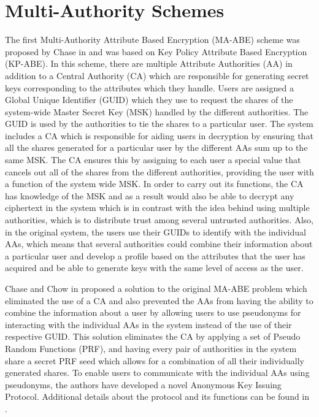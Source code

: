 \section{Multi-Authority Schemes}

The first Multi-Authority Attribute Based Encryption (MA-ABE) scheme was proposed by Chase in \cite{Chase2007}\cite{Chow2010} and was based on Key Policy Attribute Based Encryption (KP-ABE). In this scheme, there are multiple Attribute Authorities (AA) in addition to a Central Authority (CA) which are responsible for generating secret keys corresponding to the attributes which they handle. Users are assigned a Global Unique Identifier (GUID) which they use to request the shares of the system-wide Master Secret Key (MSK) handled by the different authorities. The GUID is used by the authorities to tie the shares to a particular user. The system includes a CA which is responsible for aiding users in decryption by ensuring that all the shares generated for a particular user by the different AAs sum up to the same MSK. The CA ensures this by assigning to each user a special value that cancels out all of the shares from the different authorities, providing the user with a function of the system wide MSK. In order to carry out its functions, the CA has knowledge of the MSK and as a result would also be able to decrypt any ciphertext in the system which is in contrast with the idea behind using multiple authorities, which is to distribute trust among several untrusted authorities. Also, in the original system, the users use their GUIDs to identify with the individual AAs, which means that several authorities could combine their information about a particular user and develop a profile based on the attributes that the user has acquired and be able to generate keys with the same level of access as the user.

Chase and Chow in \cite{Chase2009} proposed a solution to the original MA-ABE problem which eliminated the use of a CA and also prevented the AAs from having the ability to combine the information about a user by allowing users to use pseudonyms for interacting with the individual AAs in the system instead of the use of their respective GUID. This solution eliminates the CA by applying a set of Pseudo Random Functions (PRF), and having every pair of authorities in the system share a secret PRF seed which allows for a combination of all their individually generated shares. To enable users to communicate with the individual AAs using pseudonyms, the authors have developed a novel Anonymous Key Issuing Protocol. Additional details about the protocol and its functions can be found in \cite{Chow2010}\cite{Chase2009}.

